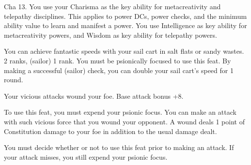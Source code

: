 {}
{Cha 13.}
{You use your Charisma as the key ability for metacreativity and telepathy disciplines. This applies to power DCs, power checks, and the minimum ability value to learn and manifest a power.}
{You use Intelligence as key ability for metacreativity powers, and Wisdom as key ability for telepathy powers.}
{}

{You can achieve fantastic speeds with your sail cart in salt flats or sandy wastes.}
{ 2 ranks,  (sailor) 1 rank.}
{You must be psionically focused to use this feat. By making a successful  (sailor) check, you can double your sail cart's speed for 1 round.}
{}{}

{Your vicious attacks wound your foe.}
{Base attack bonus +8.}
{To use this feat, you must expend your psionic focus. You can make an attack with such vicious force that you wound your opponent. A wound deals 1 point of Constitution damage to your foe in addition to the usual damage dealt.

You must decide whether or not to use this feat prior to making an attack. If your attack misses, you still expend your psionic focus.}
{}{}
